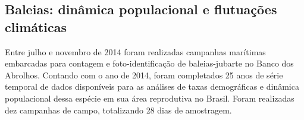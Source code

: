 \subsection{Baleias: dinâmica populacional e flutuações climáticas} %
\label{sec:dinam-popul-de} 

Entre julho e novembro de 2014 foram realizadas campanhas marítimas embarcadas para contagem e foto-identificação de baleias-jubarte no Banco dos Abrolhos. Contando com o ano de 2014, foram completados 25 anos de série temporal de dados disponíveis para as análises de taxas demográficas e dinâmica populacional dessa espécie em sua área reprodutiva no Brasil. Foram realizadas dez campanhas de campo, totalizando 28 dias de amostragem.